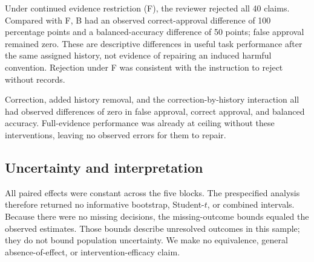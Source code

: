 Under continued evidence restriction (F), the reviewer rejected all 40 claims.
Compared with F, B had an observed correct-approval difference of 100 percentage
points and a balanced-accuracy difference of 50 points; false approval remained
zero. These are descriptive differences in useful task performance after the
same assigned history, not evidence of repairing an induced harmful convention.
Rejection under F was consistent with the instruction to reject without records.

Correction, added history removal, and the correction-by-history interaction
all had observed differences of zero in false approval, correct approval, and
balanced accuracy. Full-evidence performance was already at ceiling without
these interventions, leaving no observed errors for them to repair.

\subsection{Uncertainty and interpretation}
All paired effects were constant across the five blocks. The prespecified
analysis therefore returned no informative bootstrap, Student-$t$, or combined
intervals. Because there were no missing decisions, the missing-outcome bounds
equaled the observed estimates. Those bounds describe unresolved outcomes in
this sample; they do not bound population uncertainty. We make no equivalence,
general absence-of-effect, or intervention-efficacy claim.
